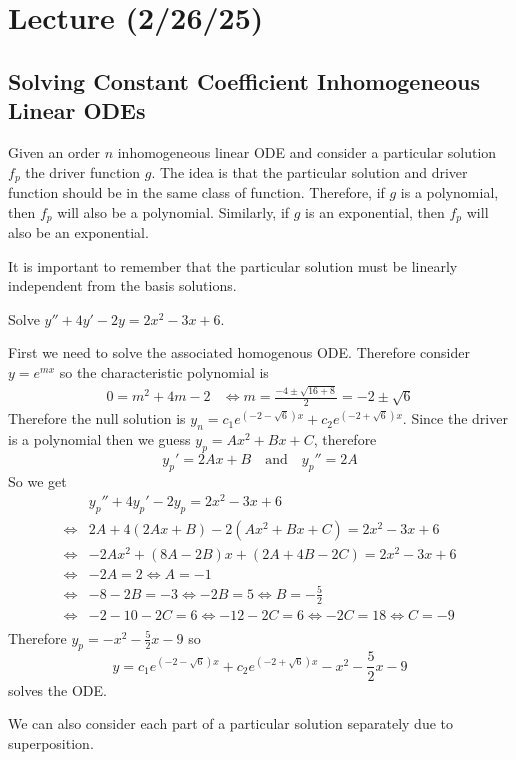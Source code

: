 \documentclass[notes]{subfiles}
\begin{document}
\setcounter{section}{11}
\section{Lecture (2/26/25)}

\subsection{Solving Constant Coefficient Inhomogeneous Linear ODEs}
Given an order $n$ inhomogeneous linear ODE and consider a particular solution $f_p$ the driver function $g$. The idea is that the particular solution and driver function should be in the same class of function. Therefore, if $g$ is a polynomial, then $f_p$ will also be a polynomial. Similarly, if $g$ is an exponential, then $f_p$ will also be an exponential.

It is important to remember that the particular solution must be linearly independent from the basis solutions.

\begin{exercise}
    Solve $y'' + 4y' - 2y = 2x^2 - 3x + 6$.
\end{exercise}
\begin{solution}
    First we need to solve the associated homogenous ODE. Therefore consider $y = e^{mx}$ so the characteristic polynomial is
    \begin{align*}
        0 = m^2 + 4m - 2
        &\iff m = \frac{-4 \pm \sqrt{16 + 8}}{2} = -2 \pm \sqrt{6}
    \end{align*}
    Therefore the null solution is $y_n = c_1e^{(-2 - \sqrt{6})x} + c_2e^{(-2 + \sqrt{6})x}$. Since the driver is a polynomial then we guess $y_p = Ax^2 + Bx + C$, therefore
    \[
        y_p' = 2Ax + B \quad \text{and} \quad y_p'' = 2A
    \]
    So we get
    \begin{align*}
        &y_p'' + 4y_p' - 2y_p = 2x^2 - 3x + 6 \\
        \iff& 2A + 4(2Ax + B) - 2(Ax^2 + Bx + C) = 2x^2 - 3x + 6 \\
        \iff& -2Ax^2 + (8A - 2B)x + (2A + 4B - 2C) = 2x^2 - 3x + 6 \\
        \iff& -2A = 2 \iff A = -1 \\
        \iff& -8 - 2B = -3 \iff -2B = 5 \iff B = -\frac{5}{2} \\
        \iff& -2 - 10 - 2C = 6 \iff -12 - 2C = 6 \iff -2C = 18 \iff C = -9 \\
    \end{align*}
    Therefore $y_p = -x^2 - \frac{5}{2}x - 9$ so
    \[
        y = c_1e^{(-2 - \sqrt{6})x} + c_2e^{(-2 + \sqrt{6})x} - x^2 - \frac{5}{2}x - 9
    \]
    solves the ODE.
\end{solution}

We can also consider each part of a particular solution separately due to superposition.
\end{document}
